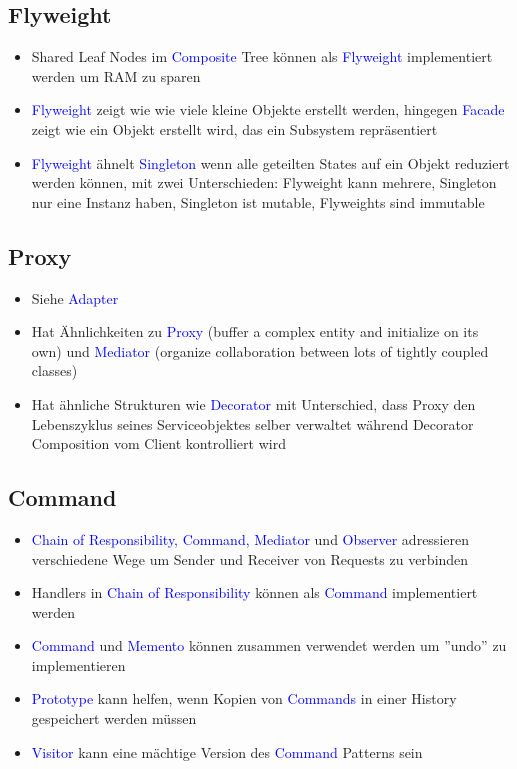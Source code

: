 \subsection{Flyweight}

\begin{itemize}
    \item Shared Leaf Nodes im \textcolor{blue}{Composite} Tree können als \textcolor{blue}{Flyweight} implementiert werden um RAM zu sparen
    \item \textcolor{blue}{Flyweight} zeigt wie wie viele kleine Objekte erstellt werden, hingegen \textcolor{blue}{Facade} zeigt wie ein Objekt erstellt wird, das ein Subsystem repräsentiert
    \item \textcolor{blue}{Flyweight} ähnelt \textcolor{blue}{Singleton} wenn alle geteilten States auf ein Objekt reduziert werden können, mit zwei Unterschieden: Flyweight kann mehrere, Singleton nur eine Instanz haben, Singleton ist mutable, Flyweights sind immutable
\end{itemize}

\subsection{Proxy}

\begin{itemize}
    \item Siehe \textcolor{blue}{Adapter}
    \item Hat Ähnlichkeiten zu \textcolor{blue}{Proxy} (buffer a complex entity and initialize on its own) und \textcolor{blue}{Mediator} (organize collaboration between lots of tightly coupled classes)
    \item Hat ähnliche Strukturen wie \textcolor{blue}{Decorator} mit Unterschied, dass Proxy den Lebenszyklus seines Serviceobjektes selber verwaltet während Decorator Composition vom Client kontrolliert wird
\end{itemize}

\subsection{Command}

\begin{itemize}
    \item \textcolor{blue}{Chain of Responsibility, Command, Mediator} und \textcolor{blue}{Observer} adressieren verschiedene Wege um Sender und Receiver von Requests zu verbinden
    \item Handlers in \textcolor{blue}{Chain of Responsibility} können als \textcolor{blue}{Command} implementiert werden
    \item \textcolor{blue}{Command} und \textcolor{blue}{Memento} können zusammen
    verwendet werden um ''undo'' zu implementieren
    \item \textcolor{blue}{Prototype} kann helfen, wenn Kopien von \textcolor{blue}{Commands} in einer History gespeichert werden müssen
    \item \textcolor{blue}{Visitor} kann eine mächtige Version des \textcolor{blue}{Command} Patterns sein
\end{itemize}


